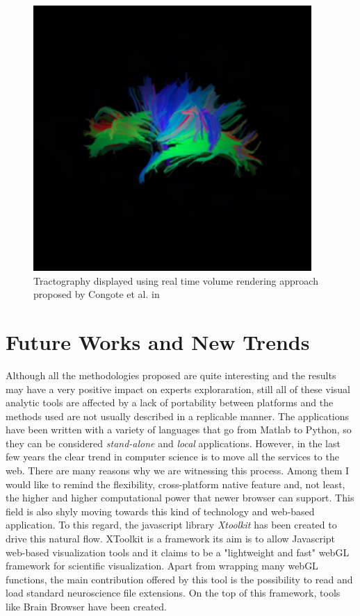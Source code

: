\documentclass{article}
\begin{document}
\begin{multicols}{2}
\begin{figure}[H]
\centering
\includegraphics[width = 0.8\columnwidth]{realTimeTractography}
\caption{Tractography displayed using real time volume rendering approach proposed by Congote et al. in \cite{congote2012real}}
\label{fig:weightedGraph}
\end{figure}


\section{Future Works and New Trends}
\label{sec:futureWorks}
Although all the methodologies proposed are quite interesting and the results may have a very positive impact on experts exploraration, still all of these visual analytic tools are affected by a lack of portability between platforms and the methods used are not usually described in a replicable manner. The applications have been written with a variety of languages that go from Matlab to Python, so they can be considered \textit{stand-alone} and \textit{local} applications. However, in the last few years the clear trend in computer science is to move all the services to the web. There are many reasons why we are witnessing this process. Among them I would like to remind the flexibility, cross-platform native feature and, not least, the higher and higher computational power that newer browser can support. This field is also shyly moving towards this kind of technology and web-based application. To this regard, the javascript library \textit{Xtoolkit} \cite{xToolkit} has been created to drive this natural flow. XToolkit is a framework its aim is to allow Javascript web-based visualization tools and it claims to be a "lightweight and fast" webGL framework for scientific visualization. Apart from wrapping many webGL functions, the main contribution offered by this tool is the possibility to read and load standard neuroscience file extensions. On the top of this framework, tools like Brain Browser \cite{brainBrowser} have been created. \\


\end{multicols}
\end{document}
